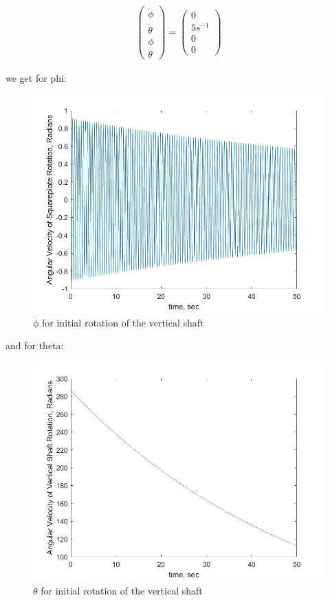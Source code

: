 \begin{equation}
    \begin{split}
        \begin{pmatrix}
            \dot \phi\\
            \dot \theta\\
            \phi\\
            \theta
        \end{pmatrix} = \begin{pmatrix}
            0\\
            5 s^{-1}\\
            0\\
            0
        \end{pmatrix}
    \end{split}
\end{equation}

we get for phi:
\begin{figure}[ht]
    \centering
    \includegraphics[scale=0.5]{images/phid_case_2.jpg}
    \caption{$\dot\phi$ for initial rotation of the vertical shaft}
    \label{fig:phid_case2}
\end{figure}
and for theta:
\begin{figure}[ht]
    \centering
    \includegraphics[scale=0.5]{images/thetad_case_2.jpg}
    \caption{$\dot\theta$ for initial rotation of the vertical shaft}
    \label{fig:thetad_case2}
\end{figure}